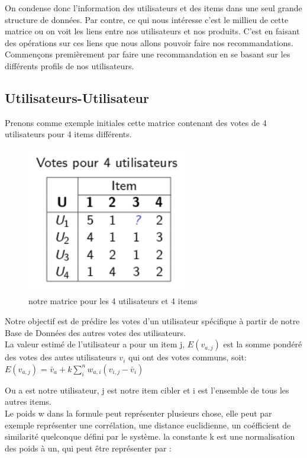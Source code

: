 \documentclass[oneside]{book}
\begin{document}
On condense donc l'information des utilisateurs et des items dans une seul grande structure de données. Par contre, ce qui nous intéresse c'est le millieu de cette matrice ou on voit les liens entre nos utilisateurs et nos produits. C'est en faisant des opérations sur ces liens que nous allons pouvoir faire nos recommandations. Commençons premièrement par faire une recommandation en se basant sur les différents profils de nos utilisateurs.

\subsection{Utilisateurs-Utilisateur}
Prenons comme exemple initiales cette matrice contenant des votes de 4 utilisateurs pour 4 items différents.
\begin{figure}[!ht]
\centering
\includegraphics[width=7cm]{exemple_user_user.png}
\caption{notre matrice pour les 4 utilisateurs et 4 items}
\label{fig:ex_user_user}
\end{figure}

Notre objectif est de prédire les votes d'un utilisateur spécifique à partir de notre Base de Données des autres votes des utilisateurs.\\

La valeur estimé de l'utilisateur a pour un item j, $E(v_{a,j})$ est la somme pondéré des votes des autes utilisateurs $v_i$ qui ont des votes communs, soit:\\

\centering
$E(v_{a,j})$ = $\bar{v}_a + k \sum\limits_i^n w_{a,i}(v_{i,j} - \bar{v}_i)$
\justify

Ou a est notre utilisateur, j est notre item cibler et i est l'ensemble de tous les autres items.\\

Le poids w dans la formule peut représenter plusieurs chose, elle peut par exemple représenter une corrélation, une distance euclidienne, un coéfficient de similarité quelconque défini par le système. la constante k est une normalisation des poids à un, qui peut être représenter par :\\
\end{document}

